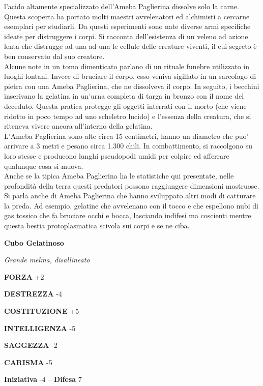\begin{multicols}{2}
l'acido altamente specializzato dell'Ameba Paglierina dissolve solo la carne. Questa scoperta ha portato molti maestri avvelenatori ed alchimisti a cercarne esemplari per studiarli. Da questi esperimenti sono nate diverse armi specifiche ideate per distruggere i corpi. Si racconta dell'esistenza di un veleno ad azione lenta che distrugge ad una ad una le cellule delle creature viventi, il cui segreto è ben conservato dal suo creatore.\\

Alcune note in un tomo dimenticato parlano di un rituale funebre utilizzato in luoghi lontani. Invece di bruciare il corpo, esso veniva sigillato in un sarcofago di pietra con una Ameba Paglierina, che ne dissolveva il corpo. In seguito, i becchini inserivano la gelatina in un'urna completa di targa in bronzo con il nome del deceduto. Questa pratica protegge gli oggetti interrati con il morto (che viene ridotto in poco tempo ad uno scheletro lucido) e l'essenza della creatura, che si riteneva vivere ancora all'interno della gelatina.\\

L'Ameba Paglierina sono alte circa 15 centimetri, hanno un diametro che puo' arrivare a 3 metri e pesano circa 1.300 chili. In combattimento, si raccolgono su loro stesse e producono lunghi pseudopodi umidi per colpire ed afferrare qualunque cosa si muova.\\

Anche se la tipica Ameba Paglierina ha le statistiche qui presentate, nelle profondità della terra questi predatori possono raggiungere dimensioni mostruose. Si parla anche di Ameba Paglierina che hanno sviluppato altri modi di catturare la preda. Ad esempio, gelatine che avvelenano con il tocco e che espellono nubi di gas tossico che fa bruciare occhi e bocca, lasciando indifesi ma coscienti mentre questa bestia protoplasmatica scivola sui corpi e se ne ciba.


\medskip{}\textbf{Cubo Gelatinoso}

\emph{Grande melma, disallineato}

\textbf{FORZA} +2

\textbf{DESTREZZA} -4

\textbf{COSTITUZIONE} +5

\textbf{INTELLIGENZA} -5

\textbf{SAGGEZZA} -2

\textbf{CARISMA} -5

\textbf{Iniziativa} -4 -- \textbf{Difesa} 7


\end{multicols}
